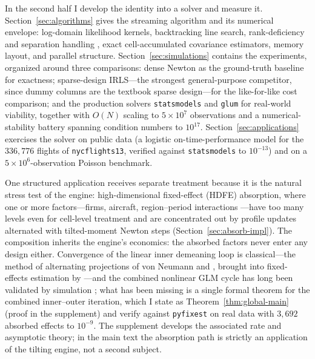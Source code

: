 \documentclass[11pt]{article}
\begin{document}
In the second half I develop the identity into a solver and measure
it.  Section~\ref{sec:algorithms} gives the streaming
algorithm and its numerical envelope: log-domain likelihood kernels,
backtracking line search, rank-deficiency and separation handling
\citep{wedderburn1976,albert1984}, exact cell-accumulated covariance
estimators, memory layout, and parallel structure.
Section~\ref{sec:simulations} contains the experiments, organized
around three comparisons: dense Newton as the ground-truth baseline for
exactness; sparse-design IRLS---the strongest general-purpose
competitor, since dummy columns are the textbook sparse design---for
the like-for-like cost comparison; and the production solvers
\texttt{statsmodels} \citep{seabold2010} and \texttt{glum}
\citep{tabmat2021} for real-world viability, together with $O(N)$
scaling to $5\times10^7$ observations and a numerical-stability battery
spanning condition numbers to $10^{17}$.  Section~\ref{sec:applications}
exercises the solver on public data (a logistic on-time-performance
model for the $336{,}776$ flights of \texttt{nycflights13}, verified
against \texttt{statsmodels} to $10^{-13}$) and on a
$5\times10^6$-observation Poisson benchmark.

One structured application receives separate treatment because it is
the natural stress test of the engine: high-dimensional fixed-effect
(HDFE) absorption, where one or more factors---firms, aircraft,
region--period interactions \citep{abowd1999}---have too many levels
even for cell-level treatment and are concentrated out by profile
updates alternated with tilted-moment Newton steps
(Section~\ref{sec:absorb-impl}).  The composition inherits the
engine's economics: the absorbed factors never enter any design either.
Convergence of the linear inner demeaning loop is classical---the
method of alternating projections of von Neumann and
\citet{halperin1962}, brought into fixed-effects estimation by
\citet{gaure2013}---and the combined nonlinear GLM cycle has long been
validated by simulation \citep{guimaraes2010,berge2018,correia2020};
what has been missing is a single formal theorem for the combined
inner--outer iteration, which I state as Theorem~\ref{thm:global-main}
(proof in the supplement) and verify against \texttt{pyfixest} on real
data with $3{,}692$ absorbed effects to $10^{-9}$.  The supplement
develops the associated rate and asymptotic theory; in the main text
the absorption path is strictly an application of the tilting engine,
not a second subject.
\end{document}

